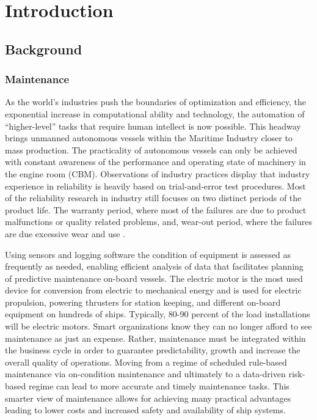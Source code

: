 \section{Introduction}
\label{sec:introduction}
\subsection{Background}
\subsubsection{Maintenance}
As the world’s industries push the boundaries of optimization and efficiency, the exponential increase in computational ability and technology, the automation of “higher-level” tasks that require human intellect is now possible. This headway brings unmanned autonomous vessels within the Maritime Industry closer to mass production. The practicality of autonomous vessels can only be achieved with constant awareness of the performance and operating state of machinery in the engine room (CBM). Observations of industry practices display that industry experience in reliability is heavily based on trial-and-error test procedures. Most of the reliability research in industry still focuses on two distinct periods of the product life. The warranty period, where most of the failures are due to product malfunctions or quality related problems, and, wear-out period, where the failures are due excessive wear and use \cite{thomas_warranty_1999}.

 Using sensors and logging software the condition of equipment is assessed as frequently as needed, enabling efficient analysis of data that facilitates planning of predictive maintenance on-board vessels. The electric motor is the most used device for conversion from electric to mechanical energy and is used for electric propulsion, powering thrusters for station keeping, and different on-board equipment on hundreds of ships. Typically, 80-90 percent of the load installations will be electric motors\cite{han_motor_2019}. Smart organizations know they can no longer afford to see maintenance as just an expense. Rather, maintenance must be integrated within the business cycle in order to guarantee predictability, growth and increase the overall quality of operations. Moving from a regime of scheduled rule-based maintenance via on-condition maintenance and ultimately to a data-driven risk-based regime can lead to more accurate and timely maintenance tasks. This smarter view of maintenance allows for achieving many practical advantages leading to lower costs and increased safety and availability of ship systems\cite{han_motor_2019}. 
 
